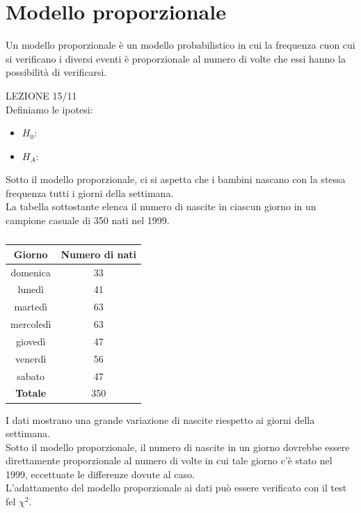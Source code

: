 \documentclass[10pt, draft]{book}
\newcommand{\tightlist}{%
\setlength{\itemsep}{1pt}\setlength{\parskip}{0pt}\setlength{\parsep}{0pt}}
\newcounter{example}[section]
\begin{document}
\section{Modello proporzionale}

Un modello proporzionale è un modello probabilistico in cui la frequenza cuon cui si verificano i diversi eventi è proporzionale al numero di volte che essi hanno la possibilità di verificarsi.

\begin{example}
LEZIONE 15/11
    \\
    Definiamo le ipotesi:
    \begin{itemize} \tightlist
    \item $H_0$:
    \item $H_A$:
    \end{itemize}
\end{example}

\begin{example}
    Sotto il modello proporzionale, ci si aspetta che i bambini nascano con la stessa frequenza tutti i giorni della settimana.
    \\
    La tabella sottostante elenca il numero di nascite in ciascun giorno in un campione casuale di 350 nati nel 1999.
    \begin{table}[H]
        \centering
        \renewcommand\arraystretch{1.2}
        \begin{tabular}{c|c}
        \hline
        \textbf{Giorno} & \textbf{Numero di nati} \\
        \hline
        domenica & 33 \\
        lunedì & 41 \\
        martedì & 63 \\
        mercoledì & 63 \\
        giovedì & 47 \\
        venerdì & 56 \\
        sabato & 47 \\
        \hline
        \textbf{Totale} & 350 \\
        \hline
        \end{tabular}
        \caption{}
        \label{}
    \end{table}\noindent
    I dati mostrano una grande variazione di nascite riespetto ai giorni della settimana.
    \\
    Sotto il modello proporzionale, il numero di nascite in un giorno dovrebbe essere direttamente proporzionale al numero di volte in cui tale giorno c'è stato nel 1999, eccettuate le differenze dovute al caso.
    \\
    L'adattamento del modello proporzionale ai dati può essere verificato con il test fel $\chi^2$.
\end{example}
\end{document}
